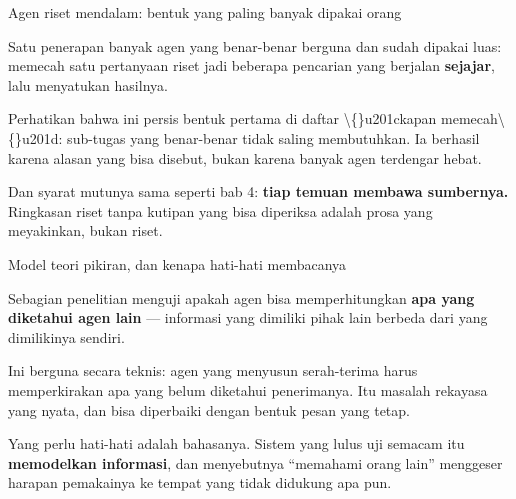 \documentclass[aspectratio=169,11pt,t]{beamer}
\begin{document}
\begin{frame}[shrink=25]{Agen riset mendalam: bentuk yang paling banyak dipakai orang}
{\fontsize{9.4}{12.6}\selectfont\color{fg2}Satu penerapan banyak agen yang benar-benar berguna dan sudah dipakai luas: memecah satu pertanyaan riset jadi beberapa pencarian yang berjalan \textbf{sejajar}, lalu menyatukan hasilnya.\par}\vskip 4pt
{\fontsize{9.4}{12.6}\selectfont\color{fg2}Perhatikan bahwa ini persis bentuk pertama di daftar \textbackslash\{\}u201ckapan memecah\textbackslash\{\}u201d: sub-tugas yang benar-benar tidak saling membutuhkan. Ia berhasil karena alasan yang bisa disebut, bukan karena banyak agen terdengar hebat.\par}\vskip 4pt
\begin{iband}[signal]
Dan syarat mutunya sama seperti bab 4: \textbf{tiap temuan membawa sumbernya.} Ringkasan riset tanpa kutipan yang bisa diperiksa adalah prosa yang meyakinkan, bukan riset.
\end{iband}
\end{frame}

\begin{frame}[shrink=25]{Model teori pikiran, dan kenapa hati-hati membacanya}
{\fontsize{9.4}{12.6}\selectfont\color{fg2}Sebagian penelitian menguji apakah agen bisa memperhitungkan \textbf{apa yang diketahui agen lain} --- informasi yang dimiliki pihak lain berbeda dari yang dimilikinya sendiri.\par}\vskip 4pt
{\fontsize{9.4}{12.6}\selectfont\color{fg2}Ini berguna secara teknis: agen yang menyusun serah-terima harus memperkirakan apa yang belum diketahui penerimanya. Itu masalah rekayasa yang nyata, dan bisa diperbaiki dengan bentuk pesan yang tetap.\par}\vskip 4pt
\begin{iband}[signal]
Yang perlu hati-hati adalah bahasanya. Sistem yang lulus uji semacam itu \textbf{memodelkan informasi}, dan menyebutnya ``memahami orang lain'' menggeser harapan pemakainya ke tempat yang tidak didukung apa pun.
\end{iband}
\end{frame}
\end{document}
